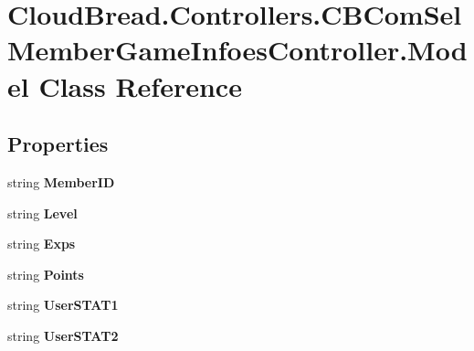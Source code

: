 \hypertarget{a00160}{}\section{Cloud\+Bread.\+Controllers.\+C\+B\+Com\+Sel\+Member\+Game\+Infoes\+Controller.\+Model Class Reference}
\label{a00160}
\subsection*{Properties}
\begin{DoxyCompactItemize}
\item 
string {\bfseries Member\+ID}\hypertarget{a00160_a66c63361d1da0096d01a96eb7acb1383}{}\label{a00160_a66c63361d1da0096d01a96eb7acb1383}

\item 
string {\bfseries Level}\hypertarget{a00160_adaefeaf71c374b484f6d892f1ecba18a}{}\label{a00160_adaefeaf71c374b484f6d892f1ecba18a}

\item 
string {\bfseries Exps}\hypertarget{a00160_a63fce7468b898a385ba3d91a989aa09d}{}\label{a00160_a63fce7468b898a385ba3d91a989aa09d}

\item 
string {\bfseries Points}\hypertarget{a00160_ac5f3995cc6c09ecdffe5602fec895cea}{}\label{a00160_ac5f3995cc6c09ecdffe5602fec895cea}

\item 
string {\bfseries User\+S\+T\+A\+T1}\hypertarget{a00160_a7d27ac1de94bb026b9ef83e58de03c4f}{}\label{a00160_a7d27ac1de94bb026b9ef83e58de03c4f}

\item 
string {\bfseries User\+S\+T\+A\+T2}\hypertarget{a00160_a012074a2f72c4eefef3f87fc55cf94db}{}\label{a00160_a012074a2f72c4eefef3f87fc55cf94db}


\end{DoxyCompactItemize}
